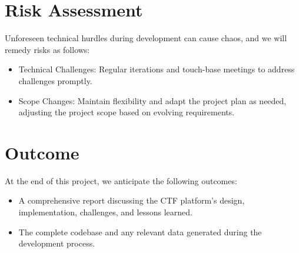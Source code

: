 \documentclass[11pt]{article}
\begin{document}
\section*{Risk Assessment}
Unforeseen technical hurdles during development can cause chaos, and we will remedy risks as follows:
\begin{itemize}
    \item Technical Challenges: Regular iterations and touch-base meetings to address challenges promptly.
    \item Scope Changes: Maintain flexibility and adapt the project plan as needed, adjusting the project scope based on evolving requirements.
\end{itemize}

\section*{Outcome}
At the end of this project, we anticipate the following outcomes:
\begin{itemize}
    \item A comprehensive report discussing the CTF platform's design, implementation, challenges, and lessons learned.
    \item The complete codebase and any relevant data generated during the development process.
\end{itemize}



\end{document}
